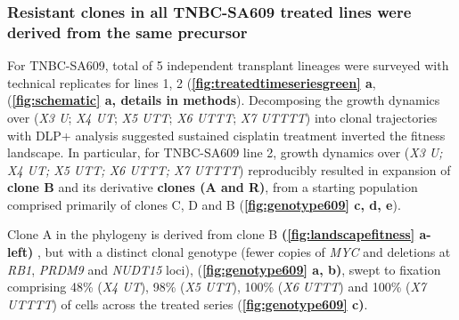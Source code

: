 \subsubsection{Resistant clones in all TNBC-SA609 treated lines were derived from the same precursor}
For TNBC-SA609, total of 5 independent transplant lineages  were surveyed with technical replicates for lines 1, 2 (\textbf{\autoref{fig:treatedtimeseriesgreen} a}, (\textbf{\autoref{fig:schematic} a, details in methods}).
Decomposing the growth dynamics over (\textit{X3 U}; \textit{X4 UT}; \textit{X5 UTT}; \textit{X6 UTTT}; \textit{X7 UTTTT}) into clonal trajectories with DLP+ analysis suggested sustained cisplatin treatment inverted the fitness landscape. In particular, for TNBC-SA609 line 2, growth dynamics over (\textit{X3 U; X4 UT; X5 UTT; X6 UTTT; X7 UTTTT}) reproducibly resulted in expansion of \textbf{clone B} and its derivative \textbf{clones (A and R)}, from a starting population comprised primarily of clones C, D and B (\textbf{\autoref{fig:genotype609} c, d, e}).

Clone A in the phylogeny is derived from clone B \textbf{(\autoref{fig:landscapefitness} a-left)} , but with a distinct clonal genotype (fewer copies of \textit{MYC} and deletions at \textit{RB1}, \textit{PRDM9} and \textit{NUDT15} loci), (\textbf{\autoref{fig:genotype609} a, b)}, swept to fixation comprising 48\% (\textit{X4 UT}), 98\% (\textit{X5 UTT}), 100\% (\textit{X6 UTTT}) and 100\% (\textit{X7 UTTTT}) of cells across the treated series (\textbf{\autoref{fig:genotype609} c)}.





